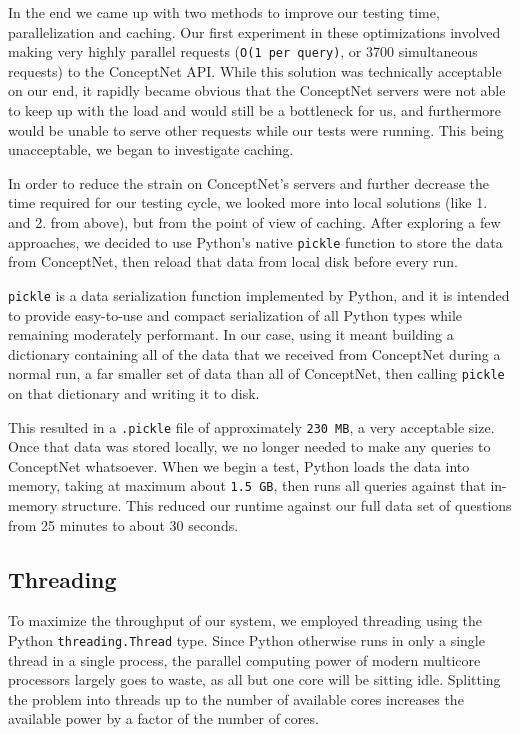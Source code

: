 \documentclass[11pt]{article}
\begin{document}
In the end we came up with two methods to improve our testing time, parallelization and caching. Our first experiment in these optimizations involved making very highly parallel requests (\verb|O(1 per query)|, or 3700 simultaneous requests) to the ConceptNet API. While this solution was technically acceptable on our end, it rapidly became obvious that the ConceptNet servers were not able to keep up with the load and would still be a bottleneck for us, and furthermore would be unable to serve other requests while our tests were running. This being unacceptable, we began to investigate caching.

In order to reduce the strain on ConceptNet's servers and further decrease the time required for our testing cycle, we looked more into local solutions (like 1. and 2. from above), but from the point of view of caching. After exploring a few approaches, we decided to use Python's native \verb|pickle| function to store the data from ConceptNet, then reload that data from local disk before every run.

\verb|pickle| is a data serialization function implemented by Python, and it is intended to provide easy-to-use and compact serialization of all Python types while remaining moderately performant. In our case, using it meant building a dictionary containing all of the data that we received from ConceptNet during a normal run, a far smaller set of data than all of ConceptNet, then calling \verb|pickle| on that dictionary and writing it to disk.

This resulted in a \verb|.pickle| file of approximately \verb|230 MB|, a very acceptable size. Once that data was stored locally, we no longer needed to make any queries to ConceptNet whatsoever. When we begin a test, Python loads the data into memory, taking at maximum about \verb|1.5 GB|, then runs all queries against that in-memory structure. This reduced our runtime against our full data set of questions from 25 minutes to about 30 seconds.

\subsection{Threading}

To maximize the throughput of our system, we employed threading using the Python \verb|threading.Thread| type. Since Python otherwise runs in only a single thread in a single process, the parallel computing power of modern multicore processors largely goes to waste, as all but one core will be sitting idle. Splitting the problem into threads up to the number of available cores increases the available power by a factor of the number of cores.
\end{document}
